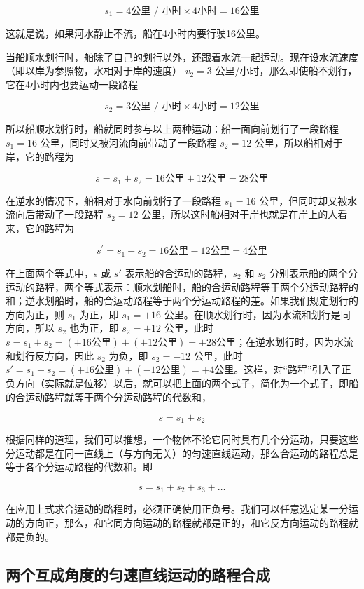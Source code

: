 \[
s _ {1} = 4 \text{公里 / 小时} \times 4 \text{小时} = 16 \text{公里}
\]

这就是说，如果河水静止不流，船在4小时内要行驶16公里。

当船顺水划行时，船除了自己的划行以外，还跟着水流一起运动。现在设水流速度（即以岸为参照物，水相对于岸的速度）
\(v_{2}=3\) 公里/小时，那么即使船不划行，它在4小时内也要运动一段路程

\[
s _ {2} = 3 \text{公里 / 小时} \times 4 \text{小时} = 12 \text{公里}
\]

所以船顺水划行时，船就同时参与以上两种运动：船一面向前划行了一段路程
\(s_1 = 16\) 公里，同时又被河流向前带动了一段路程 \(s_2 = 12\)
公里，所以船相对于岸，它的路程为

\[
s = s _ {1} + s _ {2} = 16 \text{公里} + 12 \text{公里} = 28 \text{公里}
\]

在逆水的情况下，船相对于水向前划行了一段路程 \(s_1 = 16\)
公里，但同时却又被水流向后带动了一段路程 \(s_2 = 12\)
公里，所以这时船相对于岸也就是在岸上的人看来，它的路程为

\[
s ^ {\prime} = s _ {1} - s _ {2} = 16 \text{公里} - 12 \text{公里} = 4 \text{公里}
\]

在上面两个等式中，s 或 \(s'\) 表示船的合运动的路程，\(s_{2}\) 和
\(s_{2}\)
分别表示船的两个分运动的路程，两个等式表示：顺水划船时，船的合运动路程等于两个分运动路程的和；逆水划船时，船的合运动路程等于两个分运动路程的差。如果我们规定划行的方向为正，则
\(s_{1}\) 为正，即 \(s_{1}=+16\)
公里。在顺水划行时，因为水流和划行是同方向，所以 \(s_{2}\) 也为正，即
\(s_{2}=+12\) 公里，此时
\(s=s_{1}+s_{2}=(+16 \text{公里})+(+12 \text{公里})=+28 \text{公里}\)；在逆水划行时，因为水流和划行反方向，因此
\(s_{2}\) 为负，即 \(s_{2}=-12\) 公里，此时
\(s'=s_{1}+s_{2}=(+16 \text{公里})+(-12 \text{公里})=+4 \text{公里}\)。这样，对``路程''引入了正负方向（实际就是位移）以后，就可以把上面的两个式子，简化为一个式子，即船的合运动路程就等于两个分运动路程的代数和，

\[
s = s _ {1} + s _ {2}
\]

根据同样的道理，我们可以推想，一个物体不论它同时具有几个分运动，只要这些分运动都是在同一直线上（与方向无关）的匀速直线运动，那么合运动的路程总是等于各个分运动路程的代数和。即

\[
s = s _ {1} + s _ {2} + s _ {3} + \dots
\]

在应用上式求合运动的路程时，必须正确使用正负号。我们可以任意选定某一分运动的方向正，那么，和它同方向运动的路程就都是正的，和它反方向运动的路程就都是负的。

\subsection{两个互成角度的匀速直线运动的路程合成}\label{ux4e24ux4e2aux4e92ux6210ux89d2ux5ea6ux7684ux5300ux901fux76f4ux7ebfux8fd0ux52a8ux7684ux8defux7a0bux5408ux6210}

